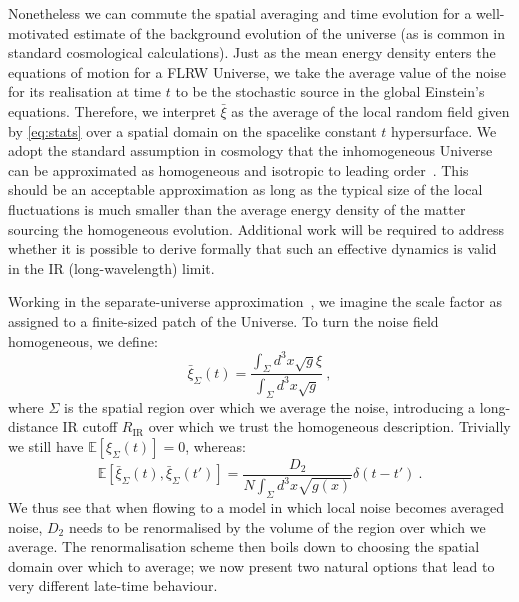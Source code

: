 \documentclass[amsmath,amssymb,11pt]{article}
\begin{document}
Nonetheless we can commute the spatial averaging and time evolution for a well-motivated estimate of the background evolution of the universe (as is common in standard cosmological calculations). Just as the mean energy density enters the equations of motion for a FLRW Universe, we take the average value of the noise for its realisation at time $t$ to be the stochastic source in the global Einstein's equations. Therefore, we interpret $\bar{\xi}$ as the average of the local random field given by \eqref{eq:stats} over a spatial domain on the spacelike constant $t$ hypersurface. We adopt the standard assumption in cosmology that the inhomogeneous Universe can be approximated as homogeneous and isotropic to leading order~\cite{maartens2011is-the-universe}. This should be an acceptable approximation as long as the typical size of the local fluctuations is much smaller than the average energy density of the matter sourcing the homogeneous evolution. Additional work will be required to address whether it is possible to derive formally that such
an effective dynamics is valid in the IR (long-wavelength) limit.

Working in the separate-universe approximation~\cite{wands2000approach}, we imagine the scale factor as assigned to a finite-sized patch of the Universe. To turn the noise field homogeneous, we define:
\begin{equation}
    \bar{\xi}_\Sigma (t) = \frac{\int_{\Sigma} d^3x \sqrt{g} \xi}{\int_\Sigma d^3x \sqrt{g}} \ ,
\end{equation}
where $\Sigma$ is the spatial region over which we average the noise, introducing a long-distance IR cutoff $R_\text{IR}$ over which we trust the homogeneous description. Trivially we still have $\mathbb{E}[\xi_\Sigma (t)]=0$, whereas:
\begin{equation}
    \mathbb{E}[\bar{\xi}_\Sigma(t),\bar{\xi}_\Sigma(t')] =\frac{D_2}{N \int_\Sigma d^3 x \sqrt{g(x)}} \delta(t-t') \ .
\end{equation}
We thus see that when flowing to a model in which local noise becomes averaged noise, $D_2$ needs to be renormalised by the volume of the region over which we average.
The renormalisation scheme then boils down to choosing the spatial domain over which to average; we now present two natural options that lead to very different late-time behaviour.
\end{document}
